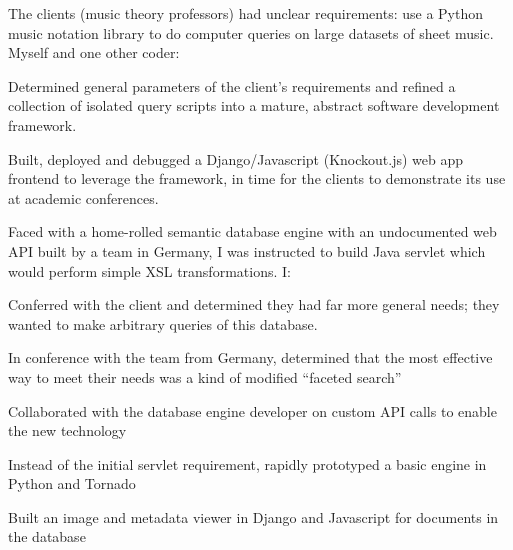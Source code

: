 \documentclass[letterpaper]{deedy-resume}
\begin{document}
\begin{minipage}[t]{0.66\textwidth}
\sectionspace


The clients (music theory professors) had unclear requirements: use a Python music notation
library to do computer queries on large datasets of sheet music. Myself and one other coder:
\vspace{\topsep}
\begin{tightitemize}
\item Determined general parameters of the client's requirements and refined a collection of
isolated query scripts into a mature, abstract software development framework.
\item Built, deployed and debugged a Django/Javascript (Knockout.js) web app frontend to leverage the
framework, in time for the clients to demonstrate its use at academic conferences.
\end{tightitemize}

\sectionspace


Faced with a home-rolled semantic database engine with an undocumented web API built by a team
in Germany, I was instructed to build Java servlet which would perform simple XSL transformations.
I:
\begin{tightitemize}
\item Conferred with the client and determined they had far more general needs; they
wanted to make arbitrary queries of this database.
\item In conference with the team from Germany, determined that the most effective
way to meet their needs was a kind of modified ``faceted search”
\item Collaborated with the database engine developer on custom API calls to enable
the new technology
\item Instead of the initial servlet requirement, rapidly prototyped a basic engine in
Python and Tornado
\item Built an image and metadata viewer in Django and Javascript for documents in the database
\end{tightitemize}

\sectionspace



\end{minipage}
\end{document}
